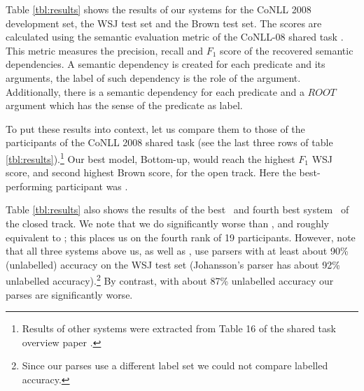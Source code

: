
Table \ref{tbl:results} shows the results of our systems for the CoNLL 2008 development set, the WSJ test set and the Brown test set. The scores are calculated using the semantic evaluation metric of the CoNLL-08 shared task \citep{surdeanu08conll}. This metric measures the precision, recall and $F_1$ score of the recovered semantic dependencies. A semantic dependency is created for each predicate and its arguments, the label of such dependency is the role of the argument. Additionally, there is a semantic dependency for each predicate and a $ROOT$ argument which has the sense of the predicate as label.



To put these results into context, let us compare them to those of the participants of the CoNLL 2008 shared task (see the last three rows of table \ref{tbl:results}).\footnote{Results of other systems were extracted from Table 16 of the shared task overview paper \citep{surdeanu08conll}.} Our best model, Bottom-up, would reach the highest $F_1$ WSJ score, and second highest Brown score, for the open track. Here the best-performing participant was \citet{vickrey08applying}. 

Table \ref{tbl:results} also shows the results of the best~\citep{johansson08dependency} and fourth best system~\citep{zhao08parsing} of the closed track. We note that we do significantly worse than \citet{johansson08dependency}, and roughly equivalent to \citet{zhao08parsing}; this places us on the fourth rank of 19 participants. However, note that all three systems above us, as well as  \citet{zhao08parsing}, use parsers with at least about 90\% (unlabelled) accuracy on the WSJ test set (Johansson's parser has about 92\% unlabelled accuracy).\footnote{Since our parses use a different label set we could not compare labelled accuracy.} By contrast, with about 87\% unlabelled accuracy our parses are significantly worse.   

